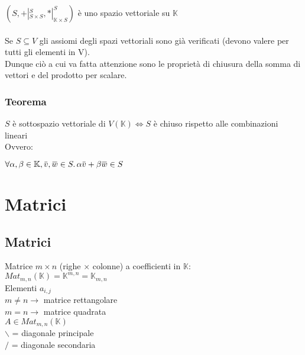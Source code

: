 \documentclass[a4paper, twoside, italian, 11pt]{book}
\newcommand{\overbar}[1]{\mkern 1.5mu\overline{\mkern-1.5mu#1\mkern-1.5mu}\mkern 1.5mu}
\newcommand{\K}{\mathbb{K}}
\begin{document}
\noindent
$(S, +|_{S \times S}^S, *|_{\K \times S}^S)$ è uno spazio vettoriale su $\K$ \\\\

\noindent
Se $S \subseteq V$ gli assiomi degli spazi vettoriali sono già verificati (devono valere per tutti gli elementi in V). \\
Dunque ciò a cui va fatta attenzione sono le proprietà di chiusura della somma di vettori e del prodotto per scalare.


\subsection{Teorema}

\noindent
$S$ è sottospazio vettoriale di $V(\K) \iff S$ è chiuso rispetto alle combinazioni lineari \\

\noindent
Ovvero:

$\forall \alpha, \beta \in \K, \overbar{v}, \overbar{w} \in S \ldotp \alpha \overbar{v} + \beta \overbar{w} \in S$




\chapter{Matrici}



\section {Matrici}

Matrice $m \times n$ (righe $\times$ colonne) a coefficienti in $\K$: \\
$Mat_{m,n}(\K) = \K^{m,n} = \K_{m,n}$ \\

\noindent
Elementi $a_{i, j}$ \\

\noindent
$m \neq n \rightarrow$ matrice rettangolare \\
$m = n \rightarrow$ matrice quadrata \\

\noindent
$A \in Mat_{m,n}(\K)$ \\

\noindent
$\backslash$ = diagonale principale \\
$/$ = diagonale secondaria \\
\end{document}
